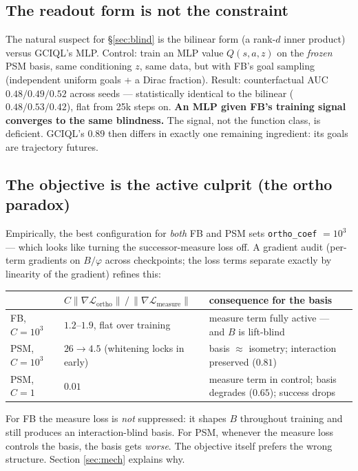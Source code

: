\documentclass[11pt,a4paper]{article}
\begin{document}
\subsection{The readout form is not the constraint}\label{sec:readout}
The natural suspect for \S\ref{sec:blind} is the bilinear form (a rank-$d$ inner product) versus
GCIQL's MLP. Control: train an MLP value $Q(s,a,z)$ on the \emph{frozen} PSM basis, same
conditioning $z$, same data, but with FB's goal sampling (independent uniform goals + a Dirac
fraction). Result: counterfactual AUC $0.48/0.49/0.52$ across seeds --- statistically identical to
the bilinear ($0.48/0.53/0.42$), flat from 25k steps on. \textbf{An MLP given FB's training signal
converges to the same blindness.} The signal, not the function class, is deficient. GCIQL's
$0.89$ then differs in exactly one remaining ingredient: its goals are trajectory futures.

\subsection{The objective is the active culprit (the ortho paradox)}\label{sec:ortho}
Empirically, the best configuration for \emph{both} FB and PSM sets \texttt{ortho\_coef}
$=10^{3}$ --- which looks like turning the successor-measure loss off. A gradient audit (per-term
gradients on $B/\varphi$ across checkpoints; the loss terms separate exactly by linearity of the
gradient) refines this:
\begin{center}\small
\begin{tabular}{@{}lll@{}}
\toprule
 & $C\|\nabla\mathcal{L}_{\mathrm{ortho}}\|\,/\,\|\nabla\mathcal{L}_{\mathrm{measure}}\|$ & consequence for the basis\\
\midrule
FB, $C{=}10^{3}$ & $1.2$--$1.9$, flat over training & measure term fully active --- and $B$ is lift-blind\\
PSM, $C{=}10^{3}$ & $26\to4.5$ (whitening locks in early) & basis $\approx$ isometry; interaction preserved ($0.81$)\\
PSM, $C{=}1$ & $0.01$ & measure term in control; basis degrades ($0.65$); success drops\\
\bottomrule
\end{tabular}
\end{center}
For FB the measure loss is \emph{not} suppressed: it shapes $B$ throughout training and still
produces an interaction-blind basis. For PSM, whenever the measure loss controls the basis, the
basis gets \emph{worse}. The objective itself prefers the wrong structure. Section
\ref{sec:mech} explains why.
\end{document}
